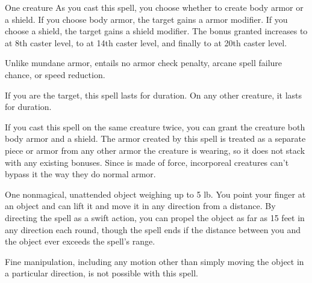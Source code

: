 \spellrng{\rngclose}
\begin{spelltarget}{One creature}
    \spelleffect As you cast this spell, you choose whether to create body armor or a shield. If you choose body armor, the target gains a  armor modifier. If you choose a shield, the target gains a  shield modifier. The bonus granted increases to  at 8th caster level, to  at 14th caster level, and finally to  at 20th caster level. 
    \par Unlike mundane armor,  entails no armor check penalty, arcane spell failure chance, or speed reduction.
    \par If you are the target, this spell lasts for \durlong duration. On any other creature, it lasts for \durshort duration.
\end{spelltarget}
\spellnotes If you cast this spell on the same creature twice, you can grant the creature both body armor and a shield. The armor created by this spell is treated as a separate piece or armor from any other armor the creature is wearing, so it does not stack with any existing bonuses. Since  is made of force, incorporeal creatures can't bypass it the way they do normal armor.

\spellrng{\rngclose}
\spelldur{\durshort}
\begin{spelltarget}{One nonmagical, unattended object weighing up to 5 lb.}
    \spelleffect You point your finger at an object and can lift it and move it in any direction from a distance. By directing the spell as a swift action, you can propel the object as far as 15 feet in any direction each round, though the spell ends if the distance between you and the object ever exceeds the spell's range.
\end{spelltarget}
\spellnotes Fine manipulation, including any motion other than simply moving the object in a particular direction, is not possible with this spell.

